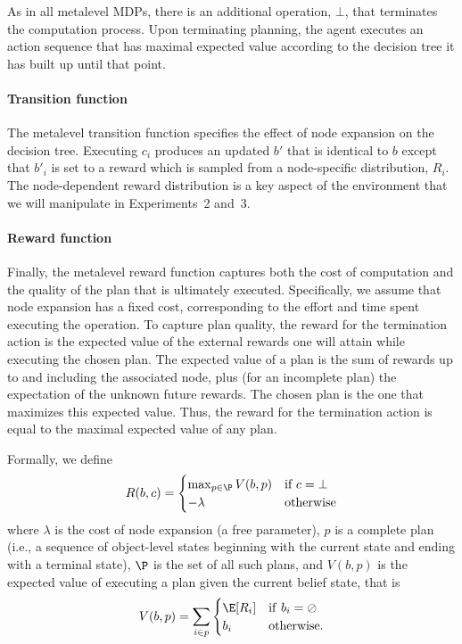 As in all metalevel MDPs, there is an additional operation, $\bot$, that terminates the computation process.  Upon terminating planning, the agent executes an action sequence that has maximal expected value according to the decision tree it has built up until that point.

\paragraph{Transition function}

The metalevel transition function specifies the effect of node expansion on the decision tree. Executing $c_i$ produces an updated $b'$ that is identical to $b$ except that $b'_i$ is set to a reward which is sampled from a node-specific distribution, $R_i$. The node-dependent reward distribution is a key aspect of the environment that we will manipulate in Experiments~2 and~3.

\paragraph{Reward function}
Finally, the metalevel reward function captures both the cost of computation and the quality of the plan that is ultimately executed. Specifically, we assume that node expansion has a fixed cost, corresponding to the effort and time spent executing the operation. To capture plan quality, the reward for the termination action is the expected value of the external rewards one will attain while executing the chosen plan. The expected value of a plan is the sum of rewards up to and including the associated node, plus (for an incomplete plan) the expectation of the unknown future rewards. The chosen plan is the one that maximizes this expected value. Thus, the reward for the termination action is equal to the maximal expected value of any plan. 

Formally, we define
%
\begin{equation}
R(b, c) = \begin{cases}
  \max_{p \in \P} V(b, p) &\text{if } c = \bot \\
  -\lambda &\text{otherwise}
\end{cases}
\end{equation}
%
where $\lambda$ is the cost of node expansion (a free parameter), $p$ is a complete plan (i.e., a sequence of object-level states beginning with the current state and ending with a terminal state), $\P$ is the set of all such plans, and $V(b, p)$ is the expected value of executing a plan given the current belief state, that is
%
\begin{equation}
  V(b, p) = \sum_{i \in p} 
\begin{cases}
\E[R_i] &\mathrm{if\ } b_i = \oslash \\
b_i &\mathrm{otherwise}.
\end{cases}
\end{equation}

